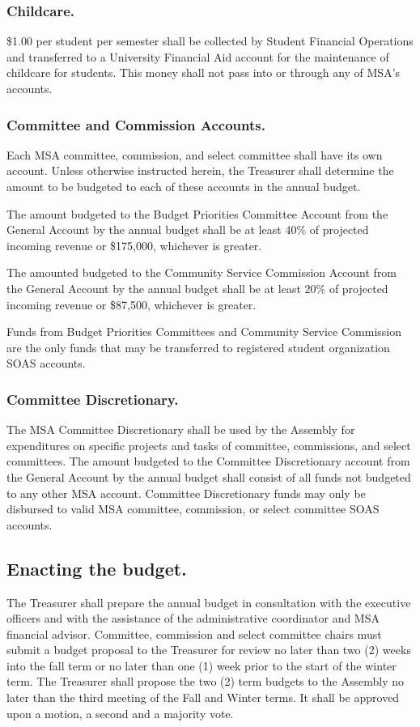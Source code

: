 \subsubsection{Childcare.}
\$1.00 per student per semester shall be collected by Student Financial Operations and transferred to a University Financial Aid account for the maintenance of childcare for students.  This money shall not pass into or through any of MSA's accounts.


\subsubsection{Committee and Commission Accounts.}
Each MSA committee, commission, and select committee shall have its own account.  Unless otherwise instructed herein, the Treasurer shall determine the amount to be budgeted to each of these accounts in the annual budget.

The amount budgeted to the Budget Priorities Committee Account from the General Account by the annual budget shall be at least 40\% of projected incoming revenue or \$175,000, whichever is greater.

The amounted budgeted to the Community Service Commission Account from the General Account by the annual budget shall be at least 20\% of projected incoming revenue or \$87,500, whichever is greater.

\subsubsubsection{}
Funds from Budget Priorities Committees and Community Service Commission are the only funds that may be transferred to registered student organization SOAS accounts.


\subsubsection{Committee Discretionary.}
The MSA Committee Discretionary shall be used by the Assembly for expenditures on specific projects and tasks of committee, commissions, and select committees. The amount budgeted to the Committee Discretionary account from the General Account by the annual budget shall consist of all funds not budgeted to any other MSA account. Committee Discretionary funds may only be disbursed to valid MSA committee, commission, or select committee SOAS accounts.


\subsection{Enacting the budget.}
The Treasurer shall prepare the annual budget in consultation with the executive officers and with the assistance of the administrative coordinator and MSA financial advisor. Committee, commission and select committee chairs must submit a budget proposal to the Treasurer for review no later than two (2) weeks into the fall term or no later than one (1) week prior to the start of the winter term. The Treasurer shall propose the two (2) term budgets to the Assembly no later than the third meeting of the Fall and Winter terms. It shall be approved upon a motion, a second and a majority vote.


